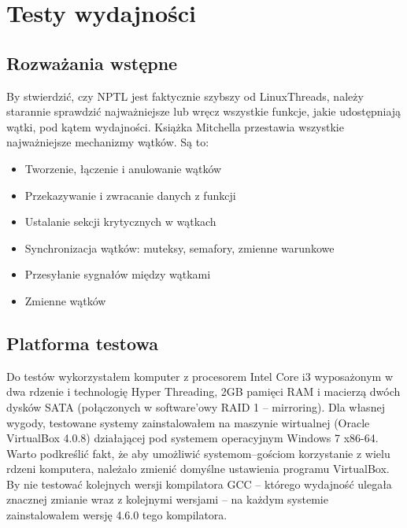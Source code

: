 \documentclass[prodmode]{acmsmall}
\begin{document}

\section{Testy wydajności}

\subsection{Rozważania wstępne}
By stwierdzić, czy NPTL jest faktycznie szybszy od LinuxThreads, należy starannie sprawdzić najważniejsze lub wręcz wszystkie funkcje, jakie udostępniają wątki, pod kątem wydajności. Książka Mitchella\cite{mitchell:advlinuxprog} przestawia wszystkie najważniejsze mechanizmy wątków. Są to:
\begin{itemize}
\item Tworzenie, łączenie i anulowanie wątków
\item Przekazywanie i zwracanie danych z funkcji
\item Ustalanie sekcji krytycznych w wątkach
\item Synchronizacja wątków: muteksy, semafory, zmienne warunkowe
\item Przesyłanie sygnałów między wątkami
\item Zmienne wątków
\end{itemize}

\subsection{Platforma testowa}
Do testów wykorzystałem komputer z procesorem Intel Core i3 wyposażonym w dwa rdzenie i technologię Hyper Threading, 2GB pamięci RAM i macierzą dwóch dysków SATA (połączonych w software'owy RAID 1 -- mirroring). Dla własnej wygody, testowane systemy zainstalowałem na maszynie wirtualnej (Oracle VirtualBox 4.0.8) działającej pod systemem operacyjnym Windows 7 x86-64. Warto podkreślić fakt, że aby umożliwić systemom--gościom korzystanie z wielu rdzeni komputera, należało zmienić domyślne ustawienia programu VirtualBox. By nie testować kolejnych wersji kompilatora GCC -- którego wydajność ulegała znacznej zmianie wraz z kolejnymi wersjami -- na każdym systemie zainstalowałem wersję 4.6.0 tego kompilatora.
\end{document}
